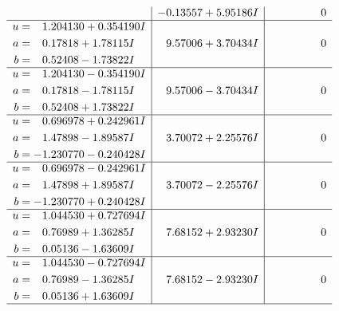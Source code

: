 \documentclass[1p]{elsarticle_modified}
\theoremstyle{definition}
\begin{document}
$$\begin{array}{c|c|c}
 & -0.13557 + 5.95186 I & \phantom{-0.000000 } 0 \\ \hline\begin{aligned}
u &= \phantom{-}1.204130 + 0.354190 I \\
a &= \phantom{-}0.17818 + 1.78115 I \\
b &= \phantom{-}0.52408 - 1.73822 I\end{aligned}
 & \phantom{-}9.57006 + 3.70434 I & \phantom{-0.000000 } 0 \\ \hline\begin{aligned}
u &= \phantom{-}1.204130 - 0.354190 I \\
a &= \phantom{-}0.17818 - 1.78115 I \\
b &= \phantom{-}0.52408 + 1.73822 I\end{aligned}
 & \phantom{-}9.57006 - 3.70434 I & \phantom{-0.000000 } 0 \\ \hline\begin{aligned}
u &= \phantom{-}0.696978 + 0.242961 I \\
a &= \phantom{-}1.47898 - 1.89587 I \\
b &= -1.230770 - 0.240428 I\end{aligned}
 & \phantom{-}3.70072 + 2.25576 I & \phantom{-0.000000 } 0 \\ \hline\begin{aligned}
u &= \phantom{-}0.696978 - 0.242961 I \\
a &= \phantom{-}1.47898 + 1.89587 I \\
b &= -1.230770 + 0.240428 I\end{aligned}
 & \phantom{-}3.70072 - 2.25576 I & \phantom{-0.000000 } 0 \\ \hline\begin{aligned}
u &= \phantom{-}1.044530 + 0.727694 I \\
a &= \phantom{-}0.76989 + 1.36285 I \\
b &= \phantom{-}0.05136 - 1.63609 I\end{aligned}
 & \phantom{-}7.68152 + 2.93230 I & \phantom{-0.000000 } 0 \\ \hline\begin{aligned}
u &= \phantom{-}1.044530 - 0.727694 I \\
a &= \phantom{-}0.76989 - 1.36285 I \\
b &= \phantom{-}0.05136 + 1.63609 I\end{aligned}
 & \phantom{-}7.68152 - 2.93230 I & \phantom{-0.000000 } 0\\
 \hline 
 \end{array}$$\newpage$$\begin{array}{c|c|c}  

\end{array}$$
\end{document}

